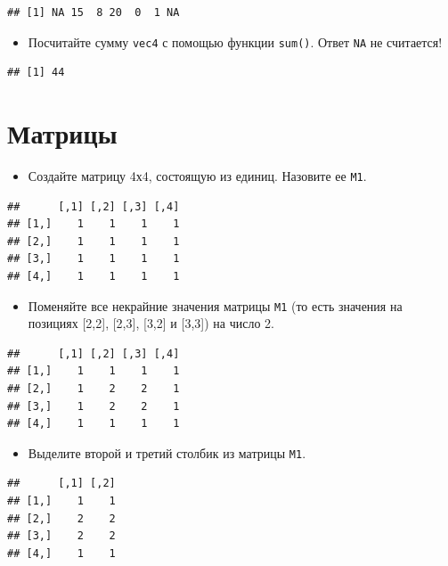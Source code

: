 \documentclass[]{book}
\providecommand{\tightlist}{%
  \setlength{\itemsep}{0pt}\setlength{\parskip}{0pt}}
\begin{document}
\begin{verbatim}
## [1] NA 15  8 20  0  1 NA
\end{verbatim}

\begin{itemize}
\tightlist
\item
  Посчитайте сумму \texttt{vec4} с помощью функции \texttt{sum()}. Ответ
  \texttt{NA} не считается!
\end{itemize}

\begin{verbatim}
## [1] 44
\end{verbatim}

\section{Матрицы}\label{task_matrix}

\begin{itemize}
\tightlist
\item
  Создайте матрицу 4х4, состоящую из единиц. Назовите ее \texttt{M1}.
\end{itemize}

\begin{verbatim}
##      [,1] [,2] [,3] [,4]
## [1,]    1    1    1    1
## [2,]    1    1    1    1
## [3,]    1    1    1    1
## [4,]    1    1    1    1
\end{verbatim}

\begin{itemize}
\tightlist
\item
  Поменяйте все некрайние значения матрицы \texttt{M1} (то есть значения
  на позициях {[}2,2{]}, {[}2,3{]}, {[}3,2{]} и {[}3,3{]}) на число 2.
\end{itemize}

\begin{verbatim}
##      [,1] [,2] [,3] [,4]
## [1,]    1    1    1    1
## [2,]    1    2    2    1
## [3,]    1    2    2    1
## [4,]    1    1    1    1
\end{verbatim}

\begin{itemize}
\tightlist
\item
  Выделите второй и третий столбик из матрицы \texttt{M1}.
\end{itemize}

\begin{verbatim}
##      [,1] [,2]
## [1,]    1    1
## [2,]    2    2
## [3,]    2    2
## [4,]    1    1
\end{verbatim}
\end{document}
